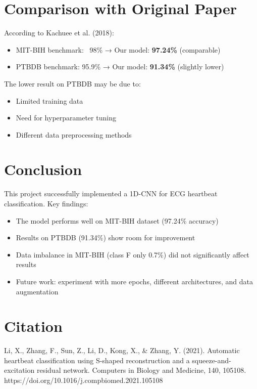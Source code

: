 \documentclass{article}
\begin{document}
\section{Comparison with Original Paper}
According to Kachuee et al. (2018):
\begin{itemize}
    \item MIT-BIH benchmark: ~98\% → Our model: \textbf{97.24\%} (comparable)
    \item PTBDB benchmark: 95.9\% → Our model: \textbf{91.34\%} (slightly lower)
\end{itemize}

The lower result on PTBDB may be due to:
\begin{itemize}
    \item Limited training data
    \item Need for hyperparameter tuning
    \item Different data preprocessing methods
\end{itemize}

\section{Conclusion}
This project successfully implemented a 1D-CNN for ECG heartbeat classification. Key findings:
\begin{itemize}
    \item The model performs well on MIT-BIH dataset (97.24\% accuracy)
    \item Results on PTBDB (91.34\%) show room for improvement
    \item Data imbalance in MIT-BIH (class F only 0.7\%) did not significantly affect results
    \item Future work: experiment with more epochs, different architectures, and data augmentation
\end{itemize}

\section{Citation}
Li, X., Zhang, F., Sun, Z., Li, D., Kong, X., \& Zhang, Y. (2021). Automatic heartbeat classification using S-shaped reconstruction and a squeeze-and-excitation residual network. Computers in Biology and Medicine, 140, 105108. https://doi.org/10.1016/j.compbiomed.2021.105108
\end{document}
